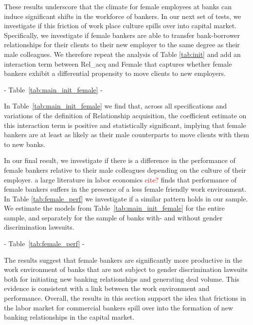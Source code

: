 These results underscore that the climate for female employees at banks can induce significant shifts in the workforce of bankers. In our next set of tests, we investigate if this friction of work place culture spills over into capital market. Specifically, we investigate if female bankers are able to  transfer bank-borrower relationships for their clients to their new employer to the same degree as their male colleagues. We therefore repeat the analysis of Table \ref{tab:init} and add an interaction term between Rel\_acq and Female that captures whether female bankers exhibit a differential propensity to move clients to new employers. 


\begin{center} - Table~\ref{tab:main_init_female} - \end{center}

In Table~\ref{tab:main_init_female} we find that, across all specifications and variations of the definition of Relationship acquisition, the coefficient estimate on this interaction term is positive and statistically significant, implying that female bankers are at least as likely as their male counterparts to move clients with them to new banks. 

In our final result, we investigate if there is a difference in the performance of female bankers relative to their male colleagues depending on the culture of their employer. a large literature in labor economics \textcolor{red}{cite? } finds that performance of female bankers suffers in the presence of a less female friendly work environment. In Table \ref{tab:female_perf}  we investigate if a similar pattern holds in our sample. We estimate the  models from Table~\ref{tab:main_init_female}  for the entire sample, and separately for the sample of banks with- and without gender discrimination lawsuits. 

\begin{center} - Table~\ref{tab:female_perf} - \end{center}

The results suggest that female bankers are significantly more productive in the work environment of banks that are not subject to gender discrimination lawsuits both for initiating new banking relationships and generating deal volume. This evidence is consistent with a link between the work environment and performance. Overall, the results in this section support the idea that frictions in the labor market for commercial bankers spill over into the formation of new banking relationships in the capital market. 


